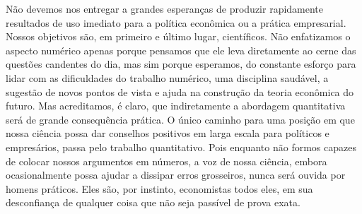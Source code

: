 \documentclass[12pt]{article}
\begin{document}
Não devemos nos entregar a grandes esperanças de produzir rapidamente resultados de uso imediato para a política econômica ou a prática empresarial. Nossos objetivos são, em primeiro e último lugar, científicos. Não enfatizamos o aspecto numérico apenas porque pensamos que ele leva diretamente ao cerne das questões candentes do dia, mas sim porque esperamos, do constante esforço para lidar com as dificuldades do trabalho numérico, uma disciplina saudável, a sugestão de novos pontos de vista e ajuda na construção da teoria econômica do futuro. Mas acreditamos, é claro, que indiretamente a abordagem quantitativa será de grande consequência prática. O único caminho para uma posição em que nossa ciência possa dar conselhos positivos em larga escala para políticos e empresários, passa pelo trabalho quantitativo. Pois enquanto não formos capazes de colocar nossos argumentos em números, a voz de nossa ciência, embora ocasionalmente possa ajudar a dissipar erros grosseiros, nunca será ouvida por homens práticos. Eles são, por instinto, economistas todos eles, em sua desconfiança de qualquer coisa que não seja passível de prova exata.
\end{document}
